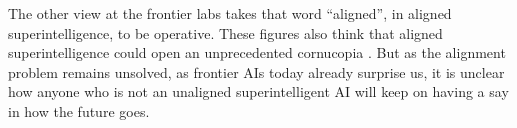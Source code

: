 The other view at the frontier labs takes that word ``aligned'', in aligned
superintelligence, to be operative. These figures also think that aligned
superintelligence could open an unprecedented cornucopia
\cite{bostrom2014superintelligence,bostrom2024utopia}. But as the alignment
problem remains unsolved, as frontier AIs today already surprise us, it is
unclear how anyone who is not an unaligned superintelligent AI will keep on
having a say in how the future goes.
